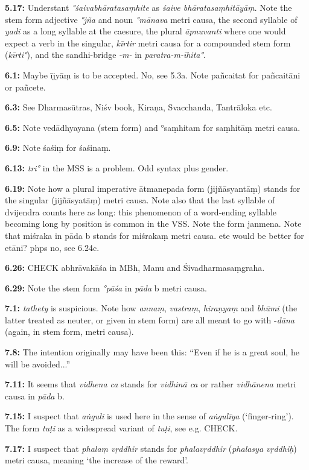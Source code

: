 \documentclass{article}
\newcommand{\vsnum}[1]{\textbf{#1}}
\newcommand{\skt}[1]{\textit{#1}}
\begin{document}
\vsnum{5.17: }Understant \skt{°śaivabhāratasaṃhite} as \skt{śaive bhāratasaṃhitāyāṃ}. Note the stem form adjective \skt{°jña} and noun \skt{°mānava} metri causa, the second syllable of \skt{yadi} as a long syllable at the caesure, the plural \skt{āpnuvanti} where one would expect a verb in the singular, \skt{kīrtir} metri causa for a compounded stem form (\skt{kīrti°}), and the sandhi-bridge \skt{-m-} in \skt{paratra-m-īhita°}. 


\vsnum{6.1: }Maybe ījyāṃ is to be accepted. No, see 5.3a. Note pañcaitat for pañcaitāni or pañcete.

\vsnum{6.3: }See Dharmasūtras, Niśv book, Kiraṇa, Svacchanda, Tantrāloka etc.

\vsnum{6.5: }Note vedādhyayana (stem form) and °saṃhitam for saṃhitāṃ metri causa.

\vsnum{6.9: }Note śaśiṃ for śaśinaṃ.

\vsnum{6.13: }\skt{tri°} in the MSS is a problem. Odd syntax plus gender.

\vsnum{6.19: }Note how a plural imperative ātmanepada form (jijñāsyantāṃ) stands for the singular (jijñāsyatāṃ) metri causa. Note also that the last syllable of dvijendra counts here as long: this phenomenon of a word-ending syllable becoming long by position is common in the VSS. Note the form janmena. Note that miśraka in pāda b stands for miśrakaṃ metri causa. ete would be better for etāni? phps no, see 6.24c.

\vsnum{6.26: }CHECK abhrāvakāśa in MBh, Manu and Śivadharmasaṃgraha.

\vsnum{6.29: }Note the stem form \skt{°pāśa} in \skt{pāda} b metri causa.


\vsnum{7.1: }\skt{tathety} is suspicious. Note how \skt{annaṃ}, \skt{vastraṃ}, \skt{hiraṇyaṃ} and \skt{bhūmi} (the latter treated as neuter, or given in stem form) are all meant to go with -\skt{dāna} (again, in stem form, metri causa).

\vsnum{7.8: }The intention originally may have been this: ``Even if he is a great soul, he will be avoided...''

\vsnum{7.11: }It seems that \skt{vidhena ca} stands for \skt{vidhinā ca} or rather \skt{vidhānena} metri causa in \skt{pāda} b.

\vsnum{7.15: }I suspect that \skt{aṅguli} is used here in the sense of \skt{aṅgulīya} (`finger-ring'). The form \skt{tuṭi} as a widespread variant of \skt{tuṭi}, see e.g. CHECK.

\vsnum{7.17: }I suspect that \skt{phalaṃ vṛddhir} stands for \skt{phalavṛddhir} (\skt{phalasya vṛddhiḥ}) metri causa, meaning `the increase of the reward'.
\end{document}
